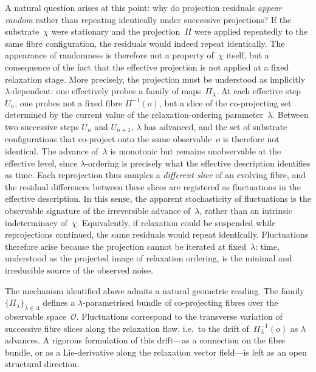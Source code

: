   A natural question arises at this point: why do projection residuals \emph{appear random}
  rather than repeating identically under successive projections?
  If the substrate~$\chi$ were stationary and the projection~$\Pi$ were applied repeatedly to
  the same fibre configuration, the residuals would indeed repeat identically.
  The appearance of randomness is therefore not a property of~$\chi$ itself, but a consequence
  of the fact that the effective projection is not applied at a fixed relaxation stage.
  More precisely, the projection must be understood as implicitly $\lambda$-dependent:
  one effectively probes a family of maps~$\Pi_\lambda$.
  At each effective step~$U_n$, one probes not a fixed fibre $\Pi^{-1}(o)$, but a slice of the
  co-projecting set determined by the current value of the relaxation-ordering
  parameter~$\lambda$.
  Between two successive steps $U_n$ and $U_{n+1}$, $\lambda$ has advanced, and the set of
  substrate configurations that co-project onto the same observable~$o$ is therefore not
  identical.
  The advance of~$\lambda$ is monotonic but remains unobservable at the effective level,
  since $\lambda$-ordering is precisely what the effective description identifies as time.
  Each reprojection thus samples a \emph{different slice} of an evolving fibre, and the
  residual differences between these slices are registered as fluctuations in the effective
  description.
  In this sense, the apparent stochasticity of fluctuations is the observable signature of the
  irreversible advance of~$\lambda$, rather than an intrinsic indeterminacy of~$\chi$.
  Equivalently, if relaxation could be suspended while reprojections continued, the same
  residuals would repeat identically.
  Fluctuations therefore arise because the projection cannot be iterated at fixed~$\lambda$:
  time, understood as the projected image of relaxation ordering, is the minimal and
  irreducible source of the observed noise.

  \begin{remark}
  The mechanism identified above admits a natural geometric reading.
  The family $\{\Pi_\lambda\}_{\lambda \in \Lambda}$ defines a $\lambda$-parametrised bundle
  of co-projecting fibres over the observable space~$\mathcal{O}$.
  Fluctuations correspond to the transverse variation of successive fibre slices along the
  relaxation flow, i.e.\ to the drift of~$\Pi_\lambda^{-1}(o)$ as $\lambda$ advances.
  A rigorous formulation of this drift---as a connection on the fibre bundle, or as a
  Lie-derivative along the relaxation vector field---is left as an open structural direction.
  \end{remark}

